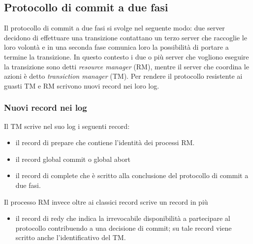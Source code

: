 \subsection{Protocollo di commit a due fasi}
Il protocollo di commit a due fasi si svolge nel seguente modo: due server decidono di effettuare una transizione contattano un terzo server che raccoglie le loro volontà e in una seconda fase comunica loro la possibilità di portare a termine la transizione. In questo contesto i due o più server che vogliono eseguire la transizione sono detti \emph{resource manager} (RM), mentre il server che coordina le azioni è detto \emph{transiction manager} (TM). Per rendere il protocollo resistente ai guasti TM e RM scrivono nuovi record nei loro log.
\subsubsection{Nuovi record nei log}
Il TM scrive nel suo log i seguenti record:
\begin{itemize}
\item il record di \textsf{prepare} che contiene l'identità dei processi RM.
\item il record \textsf{global commit} o \textsf{global abort} 
\item il record di \textsf{complete} che è scritto alla conclusione del protocollo di commit a due fasi. 
\end{itemize}
Il processo RM invece oltre ai classici record scrive un record in più
\begin{itemize}
\item il record di \textsf{redy} che indica la irrevocabile disponibilità a partecipare al protocollo contribuendo a una decisione di commit; su tale record viene scritto anche l'identificativo del TM.
\end{itemize}
